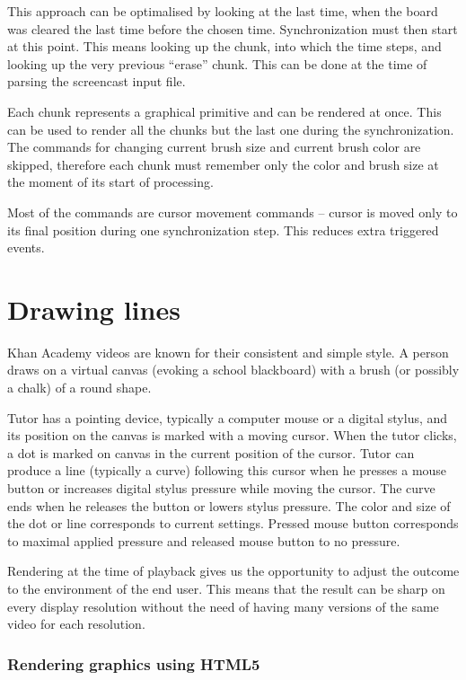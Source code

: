This approach can be optimalised by looking at the last time, when the board was cleared the last time before the chosen time. Synchronization must then start at this point. This means looking up the chunk, into which the time steps, and looking up the very previous ``erase'' chunk. This can be done at the time of parsing the screencast input file.

Each chunk represents a graphical primitive and can be rendered at once. This can be used to render all the chunks but the last one during the synchronization. The commands for changing current brush size and current brush color are skipped, therefore each chunk must remember only the color and brush size at the moment of its start of processing.

Most of the commands are cursor movement commands -- cursor is moved only to its final position during one synchronization step. This reduces extra triggered events.






\section{Drawing lines}
Khan Academy videos are known for their consistent and simple style. A person draws on a virtual canvas (evoking a school blackboard) with a brush (or possibly a chalk) of a round shape.

Tutor has a pointing device, typically a computer mouse or a digital stylus, and its position on the canvas is marked with a moving cursor. When the tutor clicks, a dot is marked on canvas in the current position of the cursor. Tutor can produce a line (typically a curve) following this cursor when he presses a mouse button or increases digital stylus pressure while moving the cursor. The curve ends when he releases the button or lowers stylus pressure. The color and size of the dot or line corresponds to current settings. Pressed mouse button corresponds to maximal applied pressure and released mouse button to no pressure.

Rendering at the time of playback gives us the opportunity to adjust the outcome to the environment of the end user. This means that the result can be sharp on every display resolution without the need of having many versions of the same video for each resolution.


\subsubsection{Rendering graphics using HTML5}

